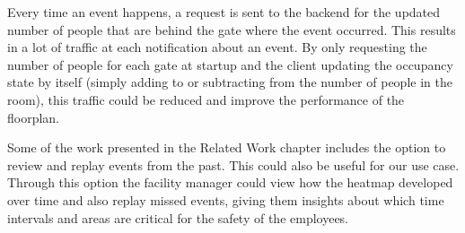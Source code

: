 Every time an event happens, a request is sent to the backend for the updated number of people that are behind the gate where the event occurred. This results in a lot of traffic at each notification about an event. By only requesting the number of people for each gate at startup and the client updating the occupancy state by itself (simply adding to or subtracting from the number of people in the room), this traffic could be reduced and improve the performance of the floorplan. 

Some of the work presented in the Related Work chapter includes the option to review and replay events from the past. This could also be useful for our use case. Through this option the facility manager could view how the heatmap developed over time and also replay missed events, giving them insights about which time intervals and areas are critical for the safety of the employees.

\clearpage

